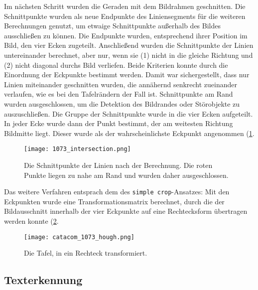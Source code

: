Im nächsten Schritt wurden die Geraden mit dem Bildrahmen geschnitten. Die Schnittpunkte wurden als neue Endpunkte des Liniensegments für die weiteren Berechnungen genutzt, um etwaige Schnittpunkte außerhalb des Bildes ausschließen zu können. Die Endpunkte wurden, entsprechend ihrer Position im Bild, den vier Ecken zugeteilt. Anschließend wurden die Schnittpunkte der Linien untereinander berechnet, aber nur, wenn sie (1) nicht in die gleiche Richtung und (2) nicht diagonal durchs Bild verliefen. Beide Kriterien konnte durch die Einordnung der Eckpunkte bestimmt werden. Damit war sichergestellt, dass nur Linien miteinander geschnitten wurden, die annähernd senkrecht zueinander verlaufen, wie es bei den Tafelrändern der Fall ist. Schnittpunkte am Rand wurden ausgeschlossen, um die Detektion des Bildrandes oder Störobjekte zu auszuschließen.
Die Gruppe der Schnittpunkte wurde in die vier Ecken aufgeteilt. In jeder Ecke wurde dann der Punkt bestimmt, der am weitesten Richtung Bildmitte liegt. Dieser wurde als der wahrscheinlichste Eckpunkt angenommen (\ref{fig:intersection}.
\begin{figure}[h!]
\centering
\texttt{[image: 1073\_intersection.png]}
\caption{Die Schnittpunkte der Linien nach der Berechnung. Die roten Punkte liegen zu nahe am Rand und wurden daher ausgeschlossen.}
\label{fig:intersection}
\end{figure}
Das weitere Verfahren entsprach dem des \verb|simple crop|-Ansatzes: Mit den Eckpunkten wurde eine Transformationsmatrix berechnet, durch die der Bildausschnitt innerhalb der vier Eckpunkte auf eine Rechtecksform übertragen werden konnte (\ref{fig:houghcrop}.
\begin{figure}[h!]
\centering
\texttt{[image: catacom\_1073\_hough.png]}
\caption{Die Tafel, in ein Rechteck transformiert.}
\label{fig:houghcrop}
\end{figure}

\subsection{Texterkennung}

